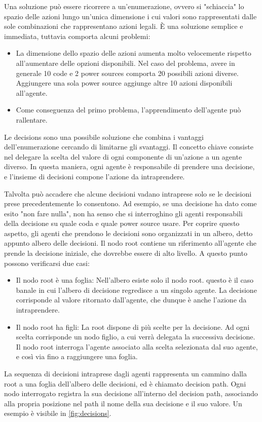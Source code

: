 \documentclass[conference]{IEEEtran}
\begin{document}
Una soluzione può essere ricorrere a un'enumerazione, ovvero si "schiaccia"
lo spazio delle azioni lungo un'unica dimensione i cui valori sono rappresentati 
dalle sole combinazioni che rappresentano azioni legali. È una soluzione semplice e
immediata, tuttavia comporta alcuni problemi:
\begin{itemize}
    \item La dimensione dello spazio delle azioni aumenta molto velocemente rispetto
    all'aumentare delle opzioni disponibili. Nel caso del problema, avere in generale
    10 code e 2 power sources comporta 20 possibili azioni diverse. Aggiungere una
    sola power source aggiunge altre 10 azioni disponibili all'agente.
    \item Come conseguenza del primo problema, l'apprendimento dell'agente può
    rallentare. %
\end{itemize}
Le decisions sono una possibile soluzione che combina i vantaggi dell'enumerazione
cercando di limitarne gli svantaggi. Il concetto chiave consiste nel delegare la scelta
del valore di ogni componente di un'azione a un agente diverso. In questa maniera,
ogni agente è responsabile di prendere una decisione, e l'insieme di decisioni compone
l'azione da intraprendere. 

Talvolta può accadere che alcune decisioni vadano intraprese solo se le decisioni prese
precedentemente lo consentono. Ad esempio, se una decisione ha dato come esito
"non fare nulla", non ha senso che si interroghino gli agenti responsabili
della decisione su quale coda e quale power source usare. Per coprire questo aspetto,
gli agenti che prendono le decisioni sono organizzati in un albero, detto appunto
albero delle decisioni. Il nodo root contiene un riferimento all'agente che prende
la decisione iniziale, che dovrebbe essere di alto livello.
A questo punto possono verificarsi due casi:
\begin{itemize}
    \item Il nodo root è una foglia: Nell'albero esiste solo il nodo root. questo
    è il caso banale in cui l'albero di decisione regredisce a un singolo agente.
    La decisione corrisponde al valore ritornato dall'agente, che dunque è anche
    l'azione da intraprendere.
    \item Il nodo root ha figli: La root dispone di più scelte per la decisione.
    Ad ogni scelta corrisponde un nodo figlio, a cui verrà delegata la successiva
    decisione. Il nodo root interroga l'agente associato alla scelta selezionata
    dal suo agente, e così via fino a raggiungere una foglia.
\end{itemize}
La sequenza di decisioni
intraprese dagli agenti rappresenta un cammino dalla root a una foglia dell'albero
delle decisioni, ed è chiamato decision path.
Ogni nodo interrogato registra la sua decisione all'interno del decision path, 
associando alla propria posizione nel path il nome della sua decisione e il suo
valore. Un esempio è visibile in \autoref{fig:decisions}.
\end{document}
